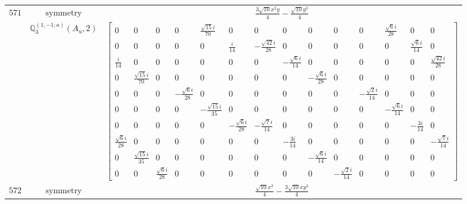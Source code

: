 \documentclass[fleqn,8pt,landscape]{jsarticle}
\begin{document}
\begin{longtable}{ccc}
$ 571 $ & $ \text{symmetry} $ & $ \frac{3 \sqrt{10} x^{2} y}{4} - \frac{\sqrt{10} y^{3}}{4} $ \\
$  $ & $ \mathbb{Q}_{3}^{(1,-1;a)}(A_{u},2) $ & $ \begin{bmatrix} 0 & 0 & 0 & 0 & \frac{\sqrt{15} i}{70} & 0 & 0 & 0 & 0 & 0 & 0 & \frac{\sqrt{6} i}{28} & 0 & 0 \\ 0 & 0 & 0 & 0 & 0 & \frac{i}{14} & - \frac{\sqrt{42} i}{28} & 0 & 0 & 0 & 0 & 0 & \frac{\sqrt{6} i}{14} & 0 \\ \frac{i}{14} & 0 & 0 & 0 & 0 & 0 & 0 & - \frac{\sqrt{6} i}{14} & 0 & 0 & 0 & 0 & 0 & \frac{\sqrt{42} i}{28} \\ 0 & \frac{\sqrt{15} i}{70} & 0 & 0 & 0 & 0 & 0 & 0 & - \frac{\sqrt{6} i}{28} & 0 & 0 & 0 & 0 & 0 \\ 0 & 0 & 0 & - \frac{\sqrt{6} i}{28} & 0 & 0 & 0 & 0 & 0 & 0 & - \frac{\sqrt{2} i}{14} & 0 & 0 & 0 \\ 0 & 0 & 0 & 0 & - \frac{\sqrt{15} i}{35} & 0 & 0 & 0 & 0 & 0 & 0 & - \frac{\sqrt{6} i}{14} & 0 & 0 \\ 0 & 0 & 0 & 0 & 0 & - \frac{\sqrt{6} i}{28} & - \frac{\sqrt{7} i}{14} & 0 & 0 & 0 & 0 & 0 & - \frac{3 i}{14} & 0 \\ \frac{\sqrt{6} i}{28} & 0 & 0 & 0 & 0 & 0 & 0 & - \frac{3 i}{14} & 0 & 0 & 0 & 0 & 0 & - \frac{\sqrt{7} i}{14} \\ 0 & \frac{\sqrt{15} i}{35} & 0 & 0 & 0 & 0 & 0 & 0 & - \frac{\sqrt{6} i}{14} & 0 & 0 & 0 & 0 & 0 \\ 0 & 0 & \frac{\sqrt{6} i}{28} & 0 & 0 & 0 & 0 & 0 & 0 & - \frac{\sqrt{2} i}{14} & 0 & 0 & 0 & 0 \end{bmatrix} $ \\ \hline
$ 572 $ & $ \text{symmetry} $ & $ \frac{\sqrt{10} x^{3}}{4} - \frac{3 \sqrt{10} x y^{2}}{4} $ \\

\end{longtable}
\end{document}
